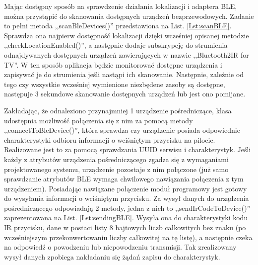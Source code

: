\documentclass[12pt,twoside]{article}
\begin{document}
Mając dostępny sposób na sprawdzenie działania lokalizacji i adaptera BLE, można przystąpić do skanowania dostępnych urządzeń bezprzewodowych. Zadanie to pełni metoda ,,scanBleDevices()'' przedstawiona na List. \ref*{Lst:scanBLE}. Sprawdza ona najpierw dostępność lokalizacji dzięki wcześniej opisanej metodzie ,,checkLocationEnabled()'', a następnie dodaje subskrypcję do strumienia odnajdywanych dostępnych urządzeń zawierających w nazwie ,,Bluetooth2IR for TV''. W ten sposób aplikacja będzie monitorować dostępne urządzenia i zapisywać je do strumienia jeśli nastąpi ich skanowanie. Następnie, zależnie od tego czy wszystkie wcześniej wymienione niezbędene zasoby są dostępne, następuje 3 sekundowe skanowanie dostępnych urządzeń lub jest ono pomijane.



Zakładając, że odnaleziono przynajmniej 1 urządzenie pośredniczące, klasa udostępnia możliwość połączenia się z nim za pomocą metody ,,connectToBleDevice()'', która sprawdza czy urządzenie posiada odpowiednie charakterystyki odbioru informacji o wciśniętym przycisku na pilocie. Realizowane jest to za pomocą sprawdzania UUID serwisu i charakterystyk. Jeśli każdy z atrybutów urządzenia pośredniczącego zgadza się z wymaganiami projektowanego systemu, urządzenie pozostaje z nim połączone (już samo sprawdzanie atrybutów BLE wymaga chwilowego nawiązania połączenia z tym urządzeniem). Posiadając nawiązane połączenie moduł programowy jest gotowy do wysyłania informacji o wciśniętym przycisku. Za wysył danych do urządzenia pośredniczącego odpowiadają 2 metody, jedna z nich to ,,sendIrCodeToDevice()'' zaprezentowana na List. \ref*{Lst:sendingBLE}. Wysyła ona do charakterystyki kodu IR przycisku, dane w postaci listy 8 bajtowych liczb całkowitych bez znaku (po wcześniejszym przekonwertowaniu liczby całkowitej na tę listę), a następnie czeka na odpowiedź o powodzeniu lub niepowodzeniu transmisji. Tak zrealizowany wysył danych zpobiega nakładaniu się żądań zapisu do charakterystyk.


\end{document}
